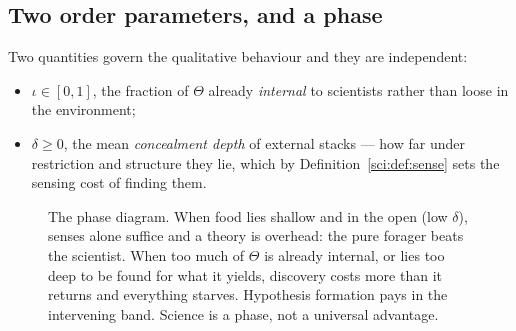 \subsection{Two order parameters, and a phase}\label{sci:S13.2}

Two quantities govern the qualitative behaviour and they are independent:
\begin{itemize}
\item $\iota \in [0,1]$, the fraction of $\Theta$ already \emph{internal} to scientists rather than
loose in the environment;
\item $\delta \ge 0$, the mean \emph{concealment depth} of external stacks --- how far under
restriction and structure they lie, which by Definition~\ref{sci:def:sense} sets the sensing cost of
finding them.
\end{itemize}

\begin{figure}[t]
\centering
{}
\caption{The phase diagram. When food lies shallow and in the open (low $\delta$), senses alone
suffice and a theory is overhead: the pure forager beats the scientist. When too much of $\Theta$ is
already internal, or lies too deep to be found for what it yields, discovery costs more than it
returns and everything starves. Hypothesis formation pays in the intervening band. Science is a phase,
not a universal advantage.}
\label{sci:fig:phase}
\end{figure}

